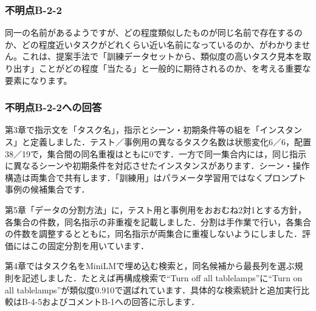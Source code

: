 \documentclass{jsarticle}
\begin{document}


\subsubsection*{不明点B-2-2}
\begin{screen}
同一の名前があるようですが、どの程度類似したものが同じ名前で存在するのか、どの程度近いタスクがどれくらい近い名前になっているのか、がわかりません。これは、提案手法で「訓練データセットから、類似度の高いタスク見本を取り出す」ことがどの程度「当たる」と一般的に期待されるのか、を考える重要な要素になります。
\end{screen}

\subsubsection*{不明点B-2-2への回答}
第3章で指示文を「タスク名」，指示とシーン・初期条件等の組を「インスタンス」と定義しました．テスト／事例用の異なるタスク名数は状態変化6／6，配置38／19で，集合間の同名重複はともに0です．一方で同一集合内には，同じ指示に異なるシーンや初期条件を対応させたインスタンスがあります．シーン・操作構造は両集合で共有します．「訓練用」はパラメータ学習用ではなくプロンプト事例の候補集合です．

第5章「データの分割方法」に，テスト用と事例用をおおむね2対1とする方針，各集合の件数，同名指示の非重複を記載しました．分割は手作業で行い，各集合の件数を調整するとともに，同名指示が両集合に重複しないようにしました．評価にはこの固定分割を用いています．

第4章ではタスク名をMiniLMで埋め込む検索と，同名候補から最長列を選ぶ規則を記述しました．たとえば再構成検索で``Turn off all tablelamps''に``Turn on all tablelamps''が類似度0.910で選ばれています．具体的な検索統計と追加実行比較はB-4-5およびコメントB-1への回答に示します．
\end{document}
